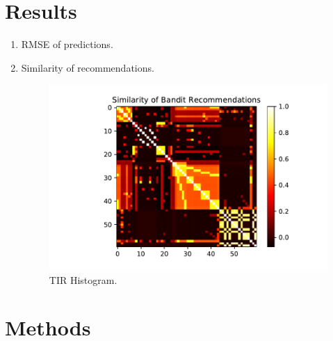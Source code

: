 \documentclass{article}
\begin{document}
\section{Results}

\begin{enumerate}
    \item RMSE of predictions.
    
    \item Similarity of recommendations. 
    \begin{figure}[t]
    \centering
    \includegraphics[scale=0.7]{plots/similarity_first_round_recommendation.pdf}
    \caption{TIR Histogram.}
    \label{fig: TIR Histogram.}
\end{figure}
\end{enumerate}{}

\section{Methods}

\newpage

\printbibliography
\end{document}
